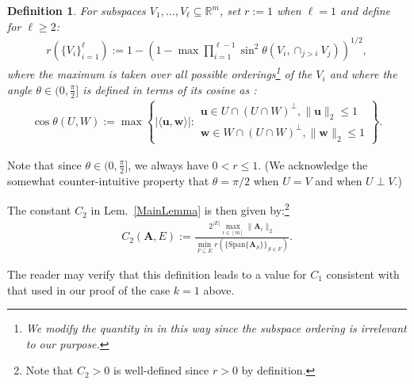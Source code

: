 \documentclass[9pt,twocolumn]{pnas-new}
\newtheorem{definition}{Definition}
\begin{document}
\begin{definition}\label{SpecialSupportSet}\label{FriedrichsDefinition}
For subspaces $V_1, \ldots, V_\ell \subseteq \mathbb{R}^m$, set $r := 1$ when $\ell = 1$ and define for $\ell \geq 2$:
\begin{align*}
r(\{V_i\}_{i=1}^\ell) := 1 - \left(1 -  \max \prod_{i=1}^{\ell-1} \sin^2  \theta \left(V_i, \cap_{j>i} V_j \right)  \right)^{1/2},
\end{align*} 
%
where the maximum is taken over all possible orderings\footnote{We modify the quantity in \cite{Deutsch12} in this way since the subspace ordering is irrelevant to our purpose.} of the $V_i$ and where the angle $\theta \in (0,\frac{\pi}{2}]$ is defined in terms of its cosine as \cite[Def.~9.4]{Deutsch12}:
\begin{align*}
\cos{\theta(U,W)} := \max\left\{ |\langle \mathbf{u}, \mathbf{w} \rangle|: \substack{ \mathbf{u} \in U \cap (U \cap W)^\perp, \|\mathbf{u}\|_2 \leq 1 \\ \mathbf{w} \in W \cap (U \cap W)^\perp, \|\mathbf{w}\|_2 \leq 1 } \right\}.
\end{align*}
\end{definition}
Note that since $\theta \in (0,\frac{\pi}{2}]$, we always have $0 < r \leq 1$. (We acknowledge the somewhat counter-intuitive property that $\theta =  \pi/2$ when $U = V$ and when $U \perp V$.)  %

The constant $C_2$ in Lem.~\ref{MainLemma} is then given by:\footnote{Note that $C_2 > 0$ is well-defined since $r > 0$ by definition.}
\begin{align}
C_2(\mathbf{A}, E) := \frac{ 2^{|E|} \max_{i \in [m]} \|\mathbf{A}_i\|_2}{ \min_{F \subseteq E} r( \{ \text{Span}\{\mathbf{A}_{S}\} \}_{S \in F}) }.
\end{align}

The reader may verify that this definition leads to a value for $C_1$ consistent with that used in our proof of the case $k=1$ above.
\end{document}
